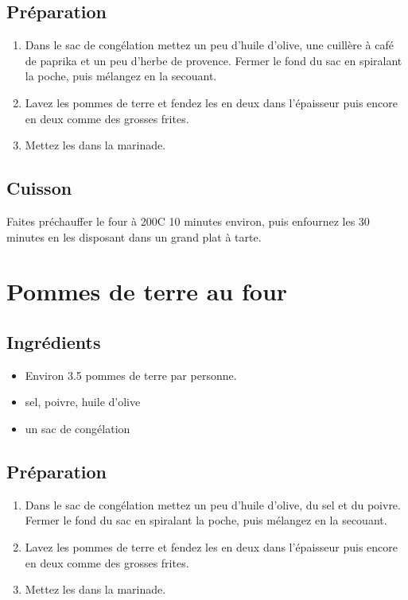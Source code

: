 \subsection*{Préparation}
\begin{enumerate}
\item Dans le sac de congélation mettez un peu d'huile d'olive, une cuillère à café de paprika et un peu d'herbe de provence. Fermer le fond du sac en spiralant la poche, puis mélangez en la secouant.
\item Lavez les pommes de terre et fendez les en deux dans l'épaisseur puis encore en deux comme des grosses frites.
\item Mettez les dans la marinade.
\end{enumerate}

\subsection*{Cuisson}
Faites préchauffer le four à 200\degres C 10 minutes environ, puis enfournez les 30 minutes en les disposant dans un grand plat à tarte.

\newpage
\section{Pommes de terre au four}
\subsection*{Ingrédients}
\begin{itemize}
\item Environ 3.5 pommes de terre par personne.
\item sel, poivre, huile d'olive
\item un sac de congélation
\end{itemize}

\subsection*{Préparation}
\begin{enumerate}
\item Dans le sac de congélation mettez un peu d'huile d'olive, du sel et du poivre. Fermer le fond du sac en spiralant la poche, puis mélangez en la secouant.
\item Lavez les pommes de terre et fendez les en deux dans l'épaisseur puis encore en deux comme des grosses frites.
\item Mettez les dans la marinade.
\end{enumerate}

